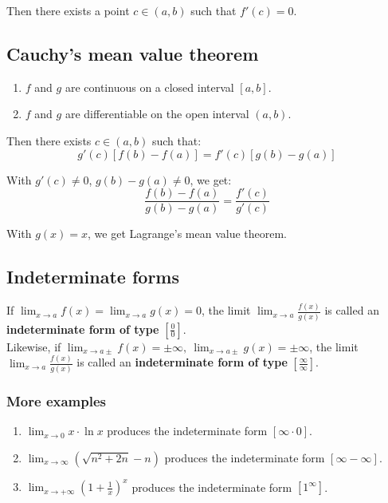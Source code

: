\documentclass[11pt]{article}
\begin{document}
Then there exists a point \(c \in (a, b)\) such that \(f'(c) = 0\).

\newpage

\subsection{Cauchy's mean value theorem}
\label{sec:orgb1cb532}
\begin{enumerate}
\item \(f\) and \(g\) are continuous on a closed interval \([a, b]\).
\item \(f\) and \(g\) are differentiable on the open interval \((a, b)\).
\end{enumerate}

Then there exists \(c \in (a, b)\) such that:
\[g'(c)[f(b) - f(a)] = f'(c)[g(b) - g(a)]\]

With \(g'(c) \neq 0\), \(g(b) - g(a) \neq 0\), we get:
\[\frac{f(b) - f(a)}{g(b) - g(a)} = \frac{f'(c)}{g'(c)}\]

With \(g(x) = x\), we get Lagrange's mean value theorem.

\subsection{Indeterminate forms}
\label{sec:orgab9818f}
If \(\lim_{x \rightarrow a} f(x) = \lim_{x \rightarrow a}g(x) = 0\), the limit \(\lim_{x \rightarrow a} \frac{f(x)}{g(x)}\) is called an \textbf{indeterminate form of type} \(\left[\frac{0}{0} \right]\).
\\[0pt]

Likewise, if \(\lim_{x \rightarrow a \pm} f(x) = \pm \infty, \ \lim_{x \rightarrow a \pm} g(x) = \pm \infty\), the limit \(\lim_{x \rightarrow a} \frac{f(x)}{g(x)}\) is called an \textbf{indeterminate form of type} \(\left[ \frac{\infty}{\infty} \right]\).

\subsubsection{More examples}
\label{sec:org12f547b}
\begin{enumerate}
\item \(\lim_{x \rightarrow 0} x \cdot \ln x\) produces the indeterminate form \([\infty \cdot 0]\).
\item \(\lim_{x \rightarrow \infty} (\sqrt{n^2 + 2n} - n)\) produces the indeterminate form \([\infty - \infty]\).
\item \(\lim_{x \rightarrow +\infty} \left(1 + \frac{1}{x} \right)^x\) produces the indeterminate form \([1^{\infty}]\).
\end{enumerate}
\end{document}
